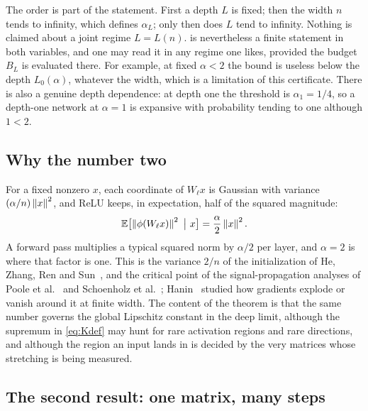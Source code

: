 The order is part of the statement. First a depth $L$ is fixed; then the width $n$ tends to infinity, which defines $\alpha_L$; only then does $L$ tend to infinity. Nothing is claimed about a joint regime $L=L(n)$.  is nevertheless a finite statement in both variables, and one may read it in any regime one likes, provided the budget $B_L$ is evaluated there. For example, at fixed $\alpha<2$ the bound is useless below the depth $L_0(\alpha)$, whatever the width, which is a limitation of this certificate. There is also a genuine depth dependence: at depth one the threshold is $\alpha_1=1/4$, so a depth-one network at $\alpha=1$ is expansive with probability tending to one although $1<2$.

\subsection{Why the number two}

For a fixed nonzero $x$, each coordinate of $W_\ell x$ is Gaussian with variance $(\alpha/n)\left\lVert x\right\rVert^2$, and ReLU keeps, in expectation, half of the squared magnitude:
\[
\E\bigl[\norm{\phi(W_\ell x)}^2\ \big|\ x\bigr]=\frac{\alpha}{2}\norm x^2.
\]
A forward pass multiplies a typical squared norm by $\alpha/2$ per layer, and $\alpha=2$ is where that factor is one. This is the variance $2/n$ of the initialization of He, Zhang, Ren and Sun~\cite{he2015}, and the critical point of the signal-propagation analyses of Poole et al.~\cite{poole2016} and Schoenholz et al.~\cite{schoenholz2017}; Hanin~\cite{hanin2018} studied how gradients explode or vanish around it at finite width. The content of the theorem is that the same number governs the global Lipschitz constant in the deep limit, although the supremum in \cref{eq:Kdef} may hunt for rare activation regions and rare directions, and although the region an input lands in is decided by the very matrices whose stretching is being measured.

\subsection{The second result: one matrix, many steps}

